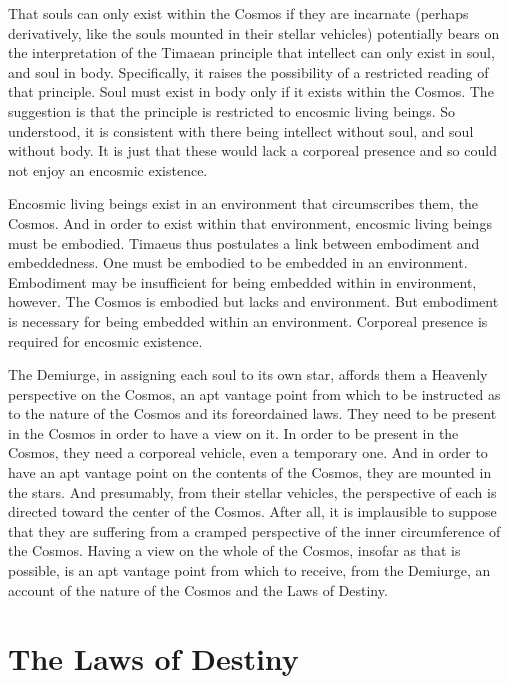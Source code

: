 That souls can only exist within the Cosmos if they are incarnate (perhaps derivatively, like the souls mounted in their stellar vehicles) potentially bears on the interpretation of the Timaean principle that intellect can only exist in soul, and soul in body. Specifically, it raises the possibility of a restricted reading of that principle. Soul must exist in body only if it exists within the Cosmos. The suggestion is that the principle is restricted to encosmic living beings. So understood, it is consistent with there being intellect without soul, and soul without body. It is just that these would lack a corporeal presence and so could not enjoy an encosmic existence. 

Encosmic living beings exist in an environment that circumscribes them, the Cosmos. And in order to exist within that environment, encosmic living beings must be embodied. Timaeus thus postulates a link between embodiment and embeddedness. One must be embodied to be embedded in an environment. Embodiment may be insufficient for being embedded within in environment, however. The Cosmos is embodied but lacks and environment. But embodiment is necessary for being embedded within an environment. Corporeal presence is required for encosmic existence.

The Demiurge, in assigning each soul to its own star, affords them a Heavenly perspective on the Cosmos, an apt vantage point from which to be instructed as to the nature of the Cosmos and its foreordained laws. They need to be present in the Cosmos in order to have a view on it. In order to be present in the Cosmos, they need a corporeal vehicle, even a temporary one. And in order to have an apt vantage point on the contents of the Cosmos, they are mounted in the stars. And presumably, from their stellar vehicles, the perspective of each is directed toward the center of the Cosmos. After all, it is implausible to suppose that they are suffering from a cramped perspective of the inner circumference of the Cosmos. Having a view on the whole of the Cosmos, insofar as that is possible, is an apt vantage point from which to receive, from the Demiurge, an account of the nature of the Cosmos and the Laws of Destiny.


\section{The Laws of Destiny} %
\label{sec:the_laws_of_destiny}

